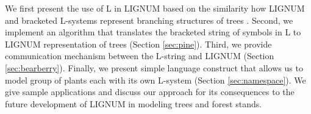We first  present the use of L  in LIGNUM based on  the similarity how
LIGNUM and bracketed L-systems represent branching structures of trees
\citep{perttunen:96,perttunen:01}.  Second,  we implement an algorithm
that  translates  the bracketed  string  of  symbols  in L  to  LIGNUM
representation of  trees (Section \ref{sec:pine}).   Third, we provide
communication  mechanism  between  the  L-string and  LIGNUM  (Section
\ref{sec:bearberry}).  Finally,  we present simple  language construct
that allows  us to model  group of plants  each with its  own L-system
(Section  \ref{sec:namespace}).   We   give  sample  applications  and
discuss our approach for its consequences to the future development of
LIGNUM in modeling trees and forest stands.

